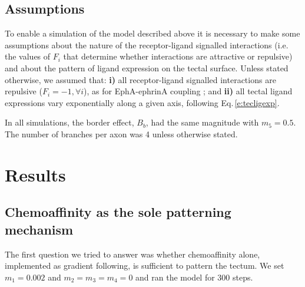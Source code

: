 \documentclass[11pt, a4paper]{article}
\begin{document}
\subsection*{Assumptions}

To enable a simulation of the model described above it is necessary to make
some assumptions about the nature of the receptor-ligand signalled
interactions (i.e. the values of $F_i$ that determine whether interactions are
attractive or repulsive) and about the pattern of ligand expression on the
tectal surface. Unless stated otherwise, we assumed that: \textbf{i)} all
receptor-ligand signalled interactions are repulsive ($F_i=-1, \forall i$), as
for EphA-ephrinA
coupling \citep{drescher_vitro_1995,nakamoto_topographically_1996};
and \textbf{ii)} all tectal ligand expressions vary exponentially along a
given axis, following Eq.\,\ref{e:tecligexp}.

In all simulations, the border effect, $B_b$, had the same magnitude with
$m_5=0.5$. The number of branches per axon was 4 unless otherwise stated.

\section{Results}

\subsection*{Chemoaffinity as the sole patterning mechanism}

The first question we tried to answer was whether chemoaffinity alone,
implemented as gradient following, is sufficient to pattern the tectum. We set
$m_1=0.002$ and $m_2=m_3=m_4=0$ and ran the model for 300
steps.
\end{document}
